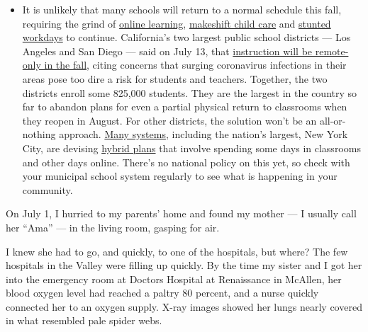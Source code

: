 \begin{itemize}
  \begin{itemize}
  \tightlist
  \item
    It is unlikely that many schools will return to a normal schedule
    this fall, requiring the grind of
    \href{https://www.nytimes.com/2020/06/05/us/coronavirus-education-lost-learning.html?action=click\&pgtype=Article\&state=default\&region=MAIN_CONTENT_3\&context=storylines_faq}{online
    learning},
    \href{https://www.nytimes.com/2020/05/29/us/coronavirus-child-care-centers.html?action=click\&pgtype=Article\&state=default\&region=MAIN_CONTENT_3\&context=storylines_faq}{makeshift
    child care} and
    \href{https://www.nytimes.com/2020/06/03/business/economy/coronavirus-working-women.html?action=click\&pgtype=Article\&state=default\&region=MAIN_CONTENT_3\&context=storylines_faq}{stunted
    workdays} to continue. California's two largest public school
    districts --- Los Angeles and San Diego --- said on July 13, that
    \href{https://www.nytimes.com/2020/07/13/us/lausd-san-diego-school-reopening.html?action=click\&pgtype=Article\&state=default\&region=MAIN_CONTENT_3\&context=storylines_faq}{instruction
    will be remote-only in the fall}, citing concerns that surging
    coronavirus infections in their areas pose too dire a risk for
    students and teachers. Together, the two districts enroll some
    825,000 students. They are the largest in the country so far to
    abandon plans for even a partial physical return to classrooms when
    they reopen in August. For other districts, the solution won't be an
    all-or-nothing approach.
    \href{https://bioethics.jhu.edu/research-and-outreach/projects/eschool-initiative/school-policy-tracker/}{Many
    systems}, including the nation's largest, New York City, are
    devising
    \href{https://www.nytimes.com/2020/06/26/us/coronavirus-schools-reopen-fall.html?action=click\&pgtype=Article\&state=default\&region=MAIN_CONTENT_3\&context=storylines_faq}{hybrid
    plans} that involve spending some days in classrooms and other days
    online. There's no national policy on this yet, so check with your
    municipal school system regularly to see what is happening in your
    community.
  \end{itemize}
\end{itemize}

On July 1, I hurried to my parents' home and found my mother --- I
usually call her ``Ama'' --- in the living room, gasping for air.

I knew she had to go, and quickly, to one of the hospitals, but where?
The few hospitals in the Valley were filling up quickly. By the time my
sister and I got her into the emergency room at Doctors Hospital at
Renaissance in McAllen, her blood oxygen level had reached a paltry 80
percent, and a nurse quickly connected her to an oxygen supply. X-ray
images showed her lungs nearly covered in what resembled pale spider
webs.

